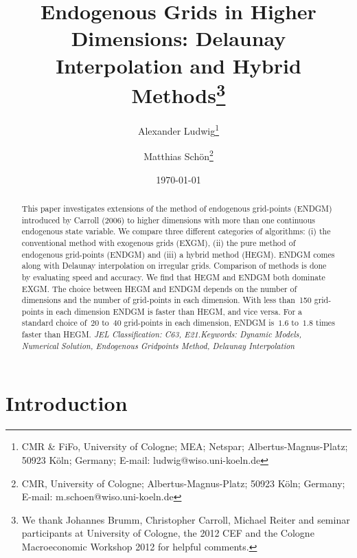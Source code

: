 \documentclass[a4paper,12pt]{article}%
\begin{document}
\title{Endogenous Grids in Higher Dimensions: Delaunay Interpolation and Hybrid
Methods\thanks{We thank Johannes Brumm, Christopher Carroll, Michael Reiter
and seminar participants at University of Cologne, the 2012 CEF and the
Cologne Macroeconomic Workshop 2012 for helpful comments.}}
\author{Alexander Ludwig\thanks{CMR \& FiFo, University of Cologne; MEA; Netspar;
Albertus-Magnus-Platz; 50923 K\"oln; Germany; E-mail:
ludwig@wiso.uni-koeln.de}
\and Matthias Sch\"{o}n\thanks{CMR, University of Cologne; Albertus-Magnus-Platz;
50923 K\"{o}ln; Germany; E-mail: m.schoen@wiso.uni-koeln.de}}
\date{\today }
\maketitle

\begin{abstract}
This paper investigates extensions of the method of endogenous grid-points
(ENDGM) introduced by Carroll (2006) to higher dimensions with more than one
continuous endogenous state variable. We compare three different categories of
algorithms: (i) the conventional method with exogenous grids (EXGM), (ii) the
pure method of endogenous grid-points (ENDGM) and (iii) a hybrid method
(HEGM). ENDGM comes along with Delaunay interpolation on irregular grids.
Comparison of methods is done by evaluating speed and accuracy. We find that
HEGM and ENDGM both dominate EXGM. The choice between HEGM and ENDGM depends
on the number of dimensions and the number of grid-points in each dimension.
With less than~150 grid-points in each dimension ENDGM is faster than HEGM,
and vice versa. For a standard choice of~$20$ to~$40$ grid-points in each
dimension, ENDGM is~$1.6$ to~$1.8$ times faster than HEGM. \newline\textit{JEL
Classification: C63, E21.\newline Keywords: Dynamic Models, Numerical
Solution, Endogenous Gridpoints Method, Delaunay Interpolation}

\end{abstract}

\newpage{} \renewcommand{\thefootnote}{\arabic{footnote}} \setcounter{footnote}{0}

\section{Introduction}
\end{document}
